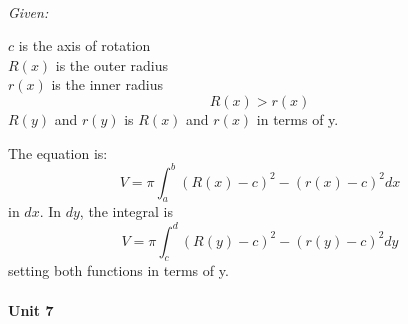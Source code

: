 \documentclass{article} %
\theoremstyle{theorem}
\theoremstyle{definition}
\begin{document}
                  \\\textit{Given:}
                    \begin{center}
                        $c$ is the axis of rotation\\
                        $R(x)$ is the outer radius\\ 
                        $r(x)$ is the inner radius $$R(x)>r(x)$$
                        $R(y)$ and $r(y)$ is $R(x)$ and $r(x)$ in terms of y.
                    \end{center}
                    The equation is:
                      \begin{equation}
                        \label{eq:volDonutDx}
                          V=\pi\int_a^b (R(x)-c)^2-(r(x)-c)^2dx
                      \end{equation}
                    in $dx$. In $dy$, the integral is 
                    \begin{equation}
                        \label{eq:volDonutDy}
                        V=\pi\int_c^d (R(y)-c)^2-(r(y)-c)^2dy
                    \end{equation}
                    setting both functions in terms of y.
            \paragraph{Unit 7}
\end{document}
